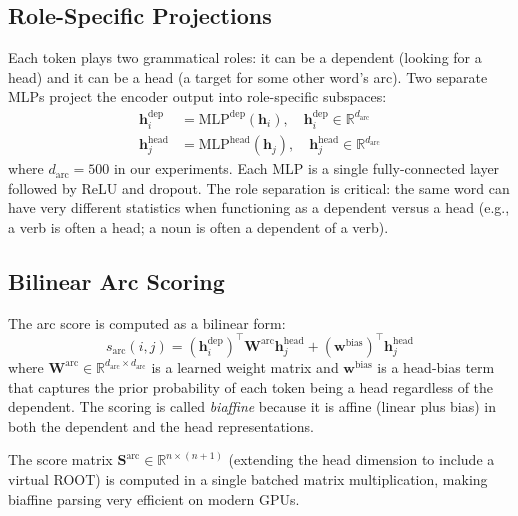 \documentclass[12pt,a4paper,oneside]{report}
\begin{document}
\subsection{Role-Specific Projections}

Each token plays two grammatical roles: it can be a dependent (looking for a
head) and it can be a head (a target for some other word's arc). Two separate
MLPs project the encoder output into role-specific subspaces:
\begin{align}
  \mathbf{h}^{\text{dep}}_i  &= \text{MLP}^{\text{dep}}(\mathbf{h}_i),
    \quad \mathbf{h}^{\text{dep}}_i \in \mathbb{R}^{d_{\text{arc}}}
    \label{eq:dep_proj} \\
  \mathbf{h}^{\text{head}}_j &= \text{MLP}^{\text{head}}(\mathbf{h}_j),
    \quad \mathbf{h}^{\text{head}}_j \in \mathbb{R}^{d_{\text{arc}}}
    \label{eq:head_proj}
\end{align}
where $d_{\text{arc}} = 500$ in our experiments. Each MLP is a single
fully-connected layer followed by ReLU and dropout. The role separation is
critical: the same word can have very different statistics when functioning
as a dependent versus a head (e.g., a verb is often a head; a noun is often
a dependent of a verb).

\subsection{Bilinear Arc Scoring}

The arc score is computed as a bilinear form:
\begin{equation}
  s_{\text{arc}}(i,j) = (\mathbf{h}^{\text{dep}}_i)^\top \mathbf{W}^{\text{arc}}
                       \mathbf{h}^{\text{head}}_j + (\mathbf{w}^{\text{bias}})^\top
                       \mathbf{h}^{\text{head}}_j
  \label{eq:biaffine_arc}
\end{equation}
where $\mathbf{W}^{\text{arc}} \in \mathbb{R}^{d_{\text{arc}} \times d_{\text{arc}}}$
is a learned weight matrix and $\mathbf{w}^{\text{bias}}$ is a head-bias term
that captures the prior probability of each token being a head regardless of
the dependent. The scoring is called \emph{biaffine} because it is affine
(linear plus bias) in both the dependent and the head representations.

The score matrix $\mathbf{S}^{\text{arc}} \in \mathbb{R}^{n \times (n+1)}$
(extending the head dimension to include a virtual ROOT) is computed in a
single batched matrix multiplication, making biaffine parsing very efficient
on modern GPUs.
\end{document}
